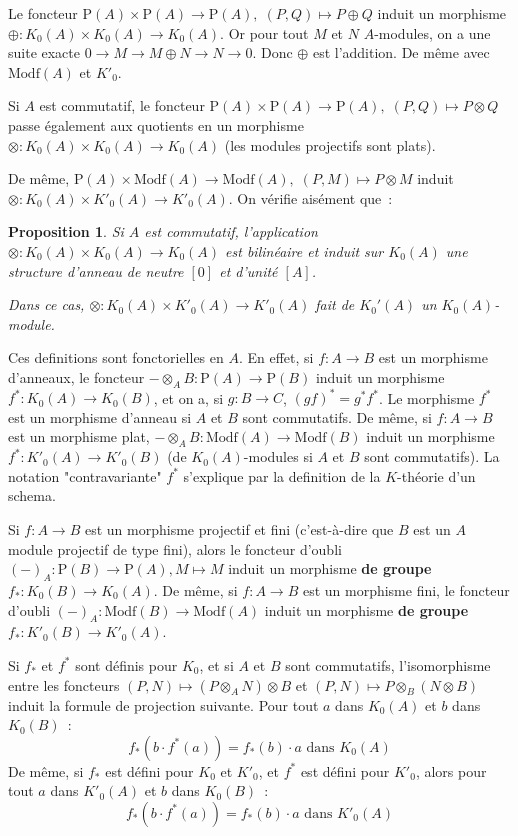 \documentclass{amsart}
\theoremstyle{plain}
\newtheorem{prop}[theo]{Proposition}
\theoremstyle{definition}
\theoremstyle{remark}
\newcommand{\Proj}[1]{\mathrm{P}({#1})}
\newcommand{\Modf}[1]{\mathrm{Modf}({#1})}
\newcommand{\ra}{\rightarrow}
\newcommand{\lra}{\longrightarrow}
\newcommand{\exa}[3]{0\ra {#1}\ra {#2}\ra {#3}\ra 0}
\begin{document}
Le foncteur $\Proj{A}\times \Proj{A}\lra \Proj{A},\;(P,Q)\mapsto P\oplus Q$ induit un morphisme $\oplus:K_0(A)\times K_0(A)\lra K_0(A)$.
Or pour tout $M$ et $N$ $A$-modules, on a une suite exacte $\exa{M}{M\oplus N}{N}$. Donc $\oplus$ est l'addition. De même avec $\Modf{A}$ et $K'_0$.

Si $A$ est commutatif, le foncteur $\Proj{A}\times \Proj{A}\lra \Proj{A},\;(P,Q)\mapsto P\otimes Q$ passe également aux quotients en un morphisme
$\otimes:K_0(A)\times K_0(A)\lra K_0(A)$ (les modules projectifs sont plats).

De même, $\Proj{A}\times \Modf{A}\lra \Modf{A},\;(P,M)\mapsto P\otimes M$ induit $\otimes:K_0(A)\times K'_0(A)\lra K'_0(A)$.
On vérifie aisément que~:
\begin{prop}
  Si $A$ est commutatif, l'application $\otimes:K_0(A)\times K_0(A)\lra K_0(A)$ est bilinéaire et induit sur $K_0(A)$ une structure d'anneau de neutre $[0]$ et d'unité $[A]$.

  Dans ce cas, $\otimes:K_0(A)\times K'_0(A)\lra K'_0(A)$ fait de $K_0'(A)$ un $K_0(A)$-module.
\end{prop}

Ces definitions sont fonctorielles en $A$. En effet, si $f:A\ra B$ est un morphisme d'anneaux, le foncteur $-\otimes_A B:\Proj{A}\ra \Proj{B}$
induit un morphisme $f^*:K_0(A)\ra K_0(B)$, et on a, si $g:B\ra C$, $(gf)^*=g^*f^*$. Le morphisme $f^*$ est un morphisme d'anneau si $A$ et $B$ sont commutatifs.
De même, si $f:A\ra B$ est un morphisme plat, $-\otimes_A B:\Modf{A}\ra \Modf{B}$ induit un morphisme $f^*:K'_0(A)\ra K'_0(B)$ (de $K_0(A)$-modules si $A$ et $B$ sont commutatifs).
La notation "contravariante" $f^*$ s'explique par la definition de la $K$-théorie d'un schema.

Si $f:A\ra B$ est un morphisme projectif et fini (c'est-à-dire que $B$ est un $A$ module projectif de type fini),
alors le foncteur d'oubli $(-)_A:\Proj{B}\ra \Proj{A}, M\mapsto M$ induit un morphisme \textbf{de groupe} $f_*:K_0(B)\ra K_0(A)$.
De même, si $f:A\lra B$ est un morphisme fini, le foncteur d'oubli $(-)_A:\Modf{B}\ra \Modf{A}$ induit un morphisme \textbf{de groupe} $f_*:K'_0(B)\ra K'_0(A)$.

Si $f_*$ et $f^*$ sont définis pour $K_0$, et si $A$ et $B$ sont commutatifs, l'isomorphisme entre les foncteurs
$(P,N)\mapsto (P\otimes_AN)\otimes B$ et $(P,N)\mapsto P\otimes_B(N\otimes B)$
induit la formule de projection suivante. Pour tout $a$ dans $K_0(A)$ et $b$ dans $K_0(B)$~:
$$f_*(b\cdot f^*(a))=f_*(b)\cdot a\text{ dans }K_0(A)$$
De même, si $f_*$ est défini pour $K_0$ et $K'_0$, et $f^*$ est défini pour $K'_0$, alors pour tout $a$ dans $K'_0(A)$ et $b$ dans $K_0(B)$~:
$$f_*(b\cdot f^*(a))=f_*(b)\cdot a\text{ dans }K'_0(A)$$
\end{document}
